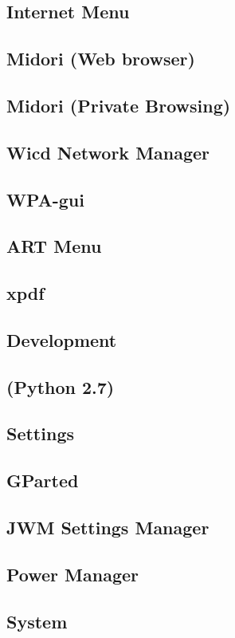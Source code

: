 \documentclass[12pt,a4paper]{book}
\begin{document}
\subsection{Internet Menu}
\subsection{Midori (Web browser)}
\subsection{Midori (Private Browsing)}
\subsection{Wicd Network Manager}
\subsection{WPA-gui}
\subsection{ART Menu}
\subsection{xpdf}
\subsection{Development}
\subsection{(Python 2.7)}

\subsection{Settings}
\subsection{GParted}
\subsection{JWM Settings Manager}
\subsection{Power Manager}

\subsection{System}
\end{document}
